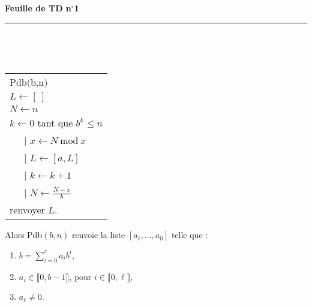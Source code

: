 \documentclass[11pt,a4paper]{article}
\title{}
\date{}
\newcommand{\HRule}{\rule{\linewidth}{0.5mm}}
\begin{document}
\pagestyle{fancy}

\fancyhead{}
 \fancyfoot{}


\newcommand{\lb}{\llbracket}
\newcommand{\rb}{\rrbracket}


\newcommand{\md}[3]{#1\ \equiv \ #2 \! \! \! \! \! \pmod {#3} }
\newcommand{\nmd}[3]{#1 \not \equiv #2 \! \! \! \! \!  \pmod {#3} }
\newcommand{\mda}[3]{#1 \equiv #2 \! \!  \pmod {#3} }
\newcommand{\nmda}[3]{#1 \not \equiv #2 \! \! \pmod {#3} }
\newcommand{\mo}[2]{#1 \! \! \! \! \! \pmod #2 }
\newcommand{\moa}[2]{#1 \! \!  \pmod #2 }


\thispagestyle{fancy}

\begin{center}
    { \huge \bfseries
    Feuille de TD n$^{\boldsymbol{\circ}}$1
     \\ [0cm] }
    \HRule \\[0.5cm]
\end{center}
\



\begin{center}
\begin{tabular}{l}
Pdb$($b,n$)$\\
$ L \leftarrow [\ ]$ \\
$N \leftarrow n$ \\
$k\leftarrow 0$
tant que $b^k\leq n$ \\
\ \ \ {\rm |} $x \leftarrow N \mathrm{\ mod\ }x$ \\
\ \ \ {\rm |}   $L\leftarrow [a,L]$ \\
\ \ \ {\rm |}   $k\leftarrow k+1$ \\ 
\ \ \ {\rm |}   $N\leftarrow \frac{N-x}{b}$ \\ 
renvoyer $L$.
\end{tabular}
\end{center}

Alors Pdb$(b,n)$ renvoie la liste $[a_\ell,\ldots,a_0]$ telle que :\begin{enumerate}
\item $b=\sum_{i=0}^\ell a_i b^i$,

\item $a_i\in \llbracket 0,b-1\rrbracket$, pour $i\in \llbracket 0,\ell\rrbracket$,

\item $a_\ell\neq 0$.
\end{enumerate}
\end{document}
